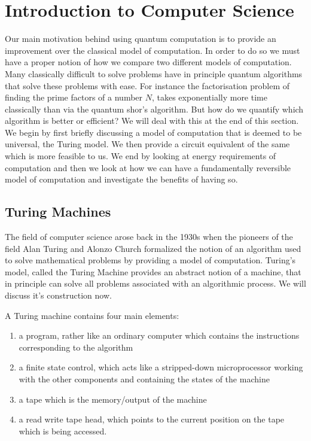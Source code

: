 \section{Introduction to Computer Science}
Our main motivation behind using quantum computation is to provide an improvement over the classical model of computation. In order to do so we must have a proper notion of how we compare two different models of computation. Many classically difficult to solve problems have in principle quantum algorithms that solve these problems with ease. For instance the factorisation problem of finding the prime factors of a number $N$, takes exponentially more time classically than via the quantum shor's algorithm. But how do we quantify which algorithm is better or efficient? We will deal with this at the end of this section. We begin by first briefly discussing a model of computation that is deemed to be universal, the Turing model. We then provide a circuit equivalent of the same which is more feasible to us. We end by looking at energy requirements of computation and then we look at how we can have a fundamentally reversible model of computation and investigate the benefits of having so.

\subsection{Turing Machines}
The field of computer science arose back in the 1930s when the pioneers of the field Alan Turing and Alonzo Church formalized the notion of an algorithm used to solve mathematical problems by providing a model of computation. Turing's model, called the Turing Machine provides an abstract notion of a machine, that in principle can solve all problems associated with an algorithmic process. We will discuss it's construction now.

A Turing machine contains four main elements:
\begin{enumerate}
    \item a program, rather like an ordinary computer which contains the instructions corresponding to the algorithm
    \item a finite state control, which acts like a stripped-down microprocessor working with the other components and containing the states of the machine
    \item a tape which is the memory/output of the machine
    \item a read write tape head, which points to the current position on the tape which is being accessed.
\end{enumerate}

